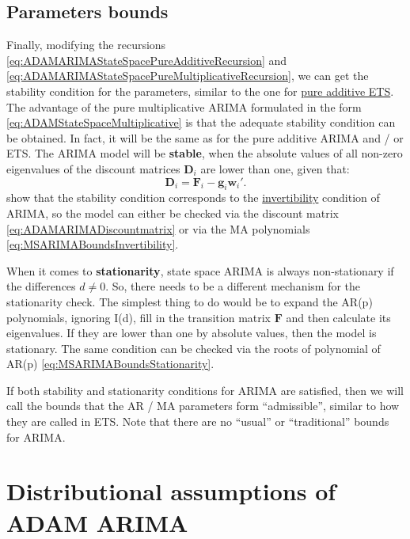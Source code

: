 \documentclass[
]{book}
\theoremstyle{definition}
\theoremstyle{definition}
\theoremstyle{definition}
\theoremstyle{definition}
\theoremstyle{remark}
\begin{document}
\hypertarget{parameters-bounds}{%
\subsection{Parameters bounds}\label{parameters-bounds}}

Finally, modifying the recursions \eqref{eq:ADAMARIMAStateSpacePureAdditiveRecursion} and \eqref{eq:ADAMARIMAStateSpacePureMultiplicativeRecursion}, we can get the stability condition for the parameters, similar to the one for \protect\hyperlink{stabilityConditionAdditiveError}{pure additive ETS}. The advantage of the pure multiplicative ARIMA formulated in the form \eqref{eq:ADAMStateSpaceMultiplicative} is that the adequate stability condition can be obtained. In fact, it will be the same as for the pure additive ARIMA and / or ETS. The ARIMA model will be \textbf{stable}, when the absolute values of all non-zero eigenvalues of the discount matrices \(\mathbf{D}_{i}\) are lower than one, given that:
\begin{equation}
  \mathbf{D}_{i} = \mathbf{F}_{i} - \mathbf{g}_{i} \mathbf{w}_{i}' .
  \label{eq:ADAMARIMADiscountmatrix}
\end{equation}
\citet{Hyndman2008b} show that the stability condition corresponds to the \protect\hyperlink{MSARIMABounds}{invertibility} condition of ARIMA, so the model can either be checked via the discount matrix \eqref{eq:ADAMARIMADiscountmatrix} or via the MA polynomials \eqref{eq:MSARIMABoundsInvertibility}.

When it comes to \textbf{stationarity}, state space ARIMA is always non-stationary if the differences \(d \neq 0\). So, there needs to be a different mechanism for the stationarity check. The simplest thing to do would be to expand the AR(p) polynomials, ignoring I(d), fill in the transition matrix \(\mathbf{F}\) and then calculate its eigenvalues. If they are lower than one by absolute values, then the model is stationary. The same condition can be checked via the roots of polynomial of AR(p) \eqref{eq:MSARIMABoundsStationarity}.

If both stability and stationarity conditions for ARIMA are satisfied, then we will call the bounds that the AR / MA parameters form ``admissible'', similar to how they are called in ETS. Note that there are no ``usual'' or ``traditional'' bounds for ARIMA.

\hypertarget{ADAMARIMADistributions}{%
\section{Distributional assumptions of ADAM ARIMA}\label{ADAMARIMADistributions}}
\end{document}
